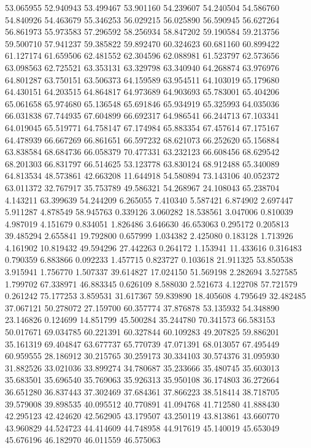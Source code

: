 53.065955
52.940943
53.499467
53.901160
54.239607
54.240504
54.586760
54.840926
54.463679
55.346253
56.029215
56.025890
56.590945
56.627264
56.861973
55.973583
57.296592
58.256934
58.847202
59.190584
59.213756
59.500710
57.941237
59.385822
59.892470
60.324623
60.681160
60.899422
61.127174
61.659506
62.481552
62.304596
62.088981
61.523797
62.573656
63.098563
62.725521
63.353131
63.329798
63.340940
64.268874
63.976976
64.801287
63.750151
63.506373
64.159589
63.954511
64.103019
65.179680
64.430151
64.203515
64.864817
64.973689
64.903693
65.783001
65.404206
65.061658
65.974680
65.136548
65.691846
65.934919
65.325993
64.035036
66.031838
67.744935
67.604899
66.692317
64.986541
66.244713
67.103341
64.019045
65.519771
64.758147
67.174984
65.883354
67.457614
67.175167
64.478939
66.667269
66.861651
66.597232
68.621073
66.252620
65.156884
63.838584
68.684736
66.058379
70.477331
63.232123
66.608456
68.629542
68.201303
66.831797
66.514625
53.123778
63.830124
68.912488
65.340089
64.813534
48.573861
42.663208
11.644918
54.580894
73.143106
40.052372
63.011372
32.767917
35.753789
49.586321
54.268967
24.108043
65.238704
4.143211
63.399639
54.244209
6.265055
7.410340
5.587421
6.874902
2.697447
5.911287
4.878549
58.945763
0.339126
3.060282
18.538561
3.047006
0.810039
4.987019
4.151679
0.834051
1.826486
3.646630
46.653063
0.295172
0.205813
39.485294
2.655841
19.792800
0.657999
1.034382
2.425080
0.183128
1.713926
4.161902
10.819432
49.594296
27.442263
0.264172
1.153941
11.433616
0.316483
0.790359
6.883866
0.092233
1.457715
0.823727
0.103618
21.911325
53.850538
3.915941
1.756770
1.507337
39.614827
17.024150
51.569198
2.282694
3.527585
1.799702
67.338971
46.883345
0.626109
8.588030
2.521673
4.122708
57.721579
0.261242
75.177253
3.859531
31.617367
59.839890
18.405608
4.795649
32.482485
37.067121
50.278072
27.159700
60.357774
37.876878
53.135932
54.348890
23.146826
0.124699
14.851799
45.500284
35.244780
70.341573
66.583153
50.017671
69.034785
60.221391
60.327844
60.109283
49.207825
59.886201
35.161319
69.404847
63.677737
65.770739
47.071391
68.013057
67.495449
60.959555
28.186912
30.215765
30.259173
30.334103
30.574376
31.095930
31.882526
33.021036
33.899274
34.780687
35.233666
35.480745
35.603013
35.683501
35.696540
35.769063
35.926313
35.950108
36.174803
36.272664
36.651280
36.837443
37.302469
37.684361
37.866223
38.518414
38.718705
39.579008
39.898535
40.095512
40.770891
41.094768
41.712580
41.888430
42.295123
42.424620
42.562905
43.179507
43.250119
43.813861
43.660770
43.960829
44.524723
44.414609
44.748958
44.917619
45.140019
45.653049
45.676196
46.182970
46.011559
46.575063
